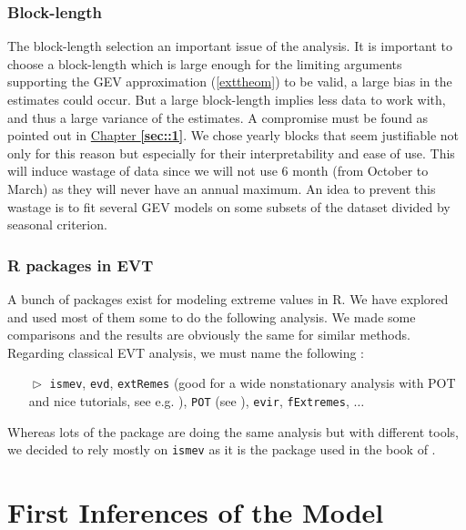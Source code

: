 
\subsubsection*{Block-length } 

The block-length selection an important issue of the analysis. It is important to choose a block-length which is large enough for the limiting arguments supporting the GEV approximation (\ref{exttheom}) to be valid, a large bias in the estimates could occur. But a large block-length implies less data to work with, and thus a large variance of the estimates. A compromise must be found as pointed out in \hyperref[sec::1]{Chapter \textbf{\ref{sec::1}}}. We chose yearly blocks that seem justifiable not only for this reason but especially for their interpretability and ease of use.
This will induce wastage of data since we will not use 6 month (from October to March) as they will never have an annual maximum. 
An idea to prevent this wastage is to fit several GEV models on some subsets of the dataset divided by seasonal criterion. 



\subsubsection*{R packages in EVT}

A bunch of packages exist for modeling extreme values in R. We have explored and used most of them some to do the following analysis. We made some comparisons and the results are obviously the same for similar methods. Regarding classical EVT analysis, we must name the following : 

\begin{itemize}
	\item[$\vartriangleright$] \texttt{ismev}, \texttt{evd}, \texttt{extRemes} (good for a wide nonstationary analysis with POT and nice tutorials, see e.g. \citet{gilleland_extremes_2016}), \texttt{POT} (see \citet{ribatet_users_2006}), \texttt{evir}, \texttt{fExtremes}, $\dots$
\end{itemize}

Whereas lots of the package are doing the same analysis but with different tools, we decided to rely mostly on \texttt{ismev} as it is the package used in the book of \citet{coles_introduction_2001}.


\section{First Inferences of the Model}

